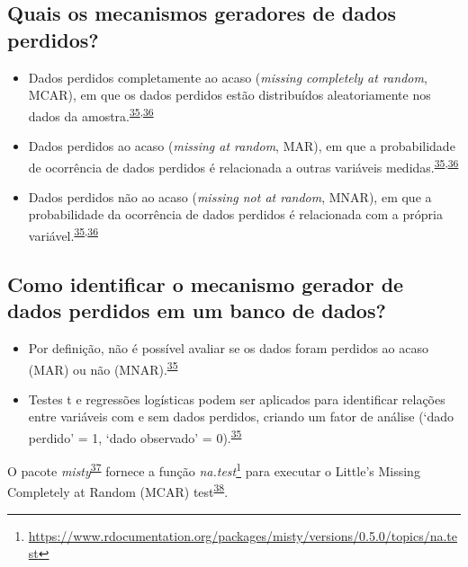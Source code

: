 \documentclass[
  a4paper,
]{book}
\renewcommand{\href}[2]{#2\footnote{\url{#1}}}
\newenvironment{infobox}[1]
  {
  \begin{itemize}
  \renewcommand{\labelitemi}{
    \raisebox{-.7\height}[0pt][0pt]{
      {\setkeys{Gin}{width=3em,keepaspectratio}
        \texttt{[image: \#1]}}
    }
  }
  \setlength{\fboxsep}{1em}
  \begin{blackbox}
  \item
  }
  {
  \end{blackbox}
  \end{itemize}
  }
\begin{document}
\hypertarget{quais-os-mecanismos-geradores-de-dados-perdidos}{%
\subsection{Quais os mecanismos geradores de dados perdidos?}\label{quais-os-mecanismos-geradores-de-dados-perdidos}}

\begin{itemize}
\item
  Dados perdidos completamente ao acaso (\emph{missing completely at random}, MCAR), em que os dados perdidos estão distribuídos aleatoriamente nos dados da amostra.\textsuperscript{\protect\hyperlink{ref-Heymans2022}{35},\protect\hyperlink{ref-carpenter2021}{36}}
\item
  Dados perdidos ao acaso (\emph{missing at random}, MAR), em que a probabilidade de ocorrência de dados perdidos é relacionada a outras variáveis medidas.\textsuperscript{\protect\hyperlink{ref-Heymans2022}{35},\protect\hyperlink{ref-carpenter2021}{36}}
\item
  Dados perdidos não ao acaso (\emph{missing not at random}, MNAR), em que a probabilidade da ocorrência de dados perdidos é relacionada com a própria variável.\textsuperscript{\protect\hyperlink{ref-Heymans2022}{35},\protect\hyperlink{ref-carpenter2021}{36}}
\end{itemize}

\hypertarget{como-identificar-o-mecanismo-gerador-de-dados-perdidos-em-um-banco-de-dados}{%
\subsection{Como identificar o mecanismo gerador de dados perdidos em um banco de dados?}\label{como-identificar-o-mecanismo-gerador-de-dados-perdidos-em-um-banco-de-dados}}

\begin{itemize}
\item
  Por definição, não é possível avaliar se os dados foram perdidos ao acaso (MAR) ou não (MNAR).\textsuperscript{\protect\hyperlink{ref-Heymans2022}{35}}
\item
  Testes t e regressões logísticas podem ser aplicados para identificar relações entre variáveis com e sem dados perdidos, criando um fator de análise (`dado perdido' = 1, `dado observado' = 0).\textsuperscript{\protect\hyperlink{ref-Heymans2022}{35}}
\end{itemize}

\begin{infobox}{images/Rlogo}
O pacote \emph{misty}\textsuperscript{\protect\hyperlink{ref-misty}{37}} fornece a função \href{https://www.rdocumentation.org/packages/misty/versions/0.5.0/topics/na.test}{\emph{na.test}} para executar o Little's Missing Completely at Random (MCAR) test\textsuperscript{\protect\hyperlink{ref-little1988}{38}}.

\end{infobox}
\end{document}
